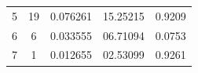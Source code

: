 \begin{tabular}{ccccc}
5                                                        & 19                                                              & 0.076261                                                              & 15.25215                                                      & 0.9209                                                                   \\
6                                                        & 6                                                               & 0.033555                                                              & 06.71094                                                      & 0.0753                                                                   \\
7                                                        & 1                                                               & 0.012655                                                              & 02.53099                                                      & 0.9261                                                                   \\
\midrule
\end{tabular}

